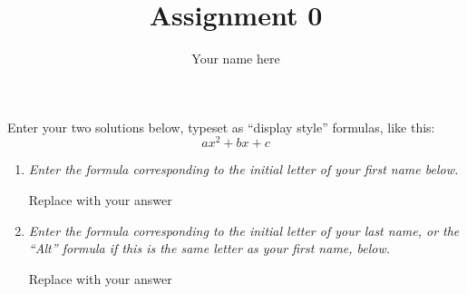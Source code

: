 \documentclass[11pt]{article}
\title{Assignment 0}
\author{Your name here}
\begin{document}
\maketitle

Enter your two solutions below, typeset as ``display style'' formulas,
like this:
\[ a x^2 + b x + c \]

\begin{enumerate}
\item \textsl{Enter the formula corresponding to the initial letter of
  your first name below.}

  Replace with your answer
  
\item \textsl{Enter the formula corresponding to the initial letter of
  your last name, or the ``Alt'' formula if this is the same letter as
  your first name, below.}

  Replace with your answer
  
\end{enumerate}
\end{document}
